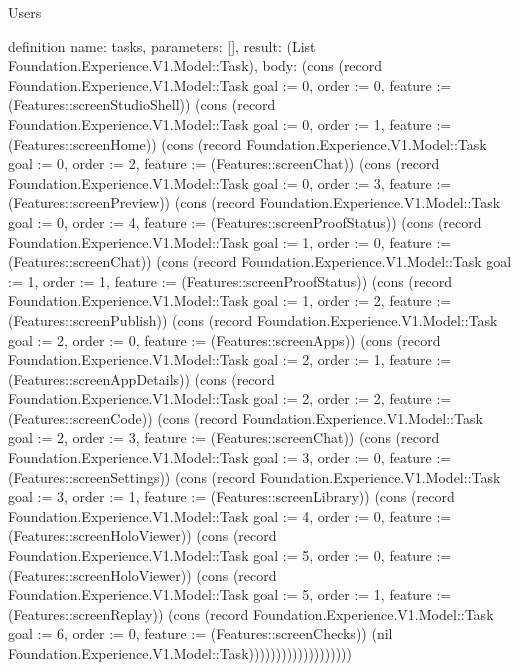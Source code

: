 \begin{lexlean}{Users}
\begin{semanticmodule}
definition{
  name: tasks,
  parameters: [],
  result: (List Foundation.Experience.V1.Model::Task),
  body: (cons (record Foundation.Experience.V1.Model::Task {goal := 0, order := 0, feature := (Features::screenStudioShell)}) (cons (record Foundation.Experience.V1.Model::Task {goal := 0, order := 1, feature := (Features::screenHome)}) (cons (record Foundation.Experience.V1.Model::Task {goal := 0, order := 2, feature := (Features::screenChat)}) (cons (record Foundation.Experience.V1.Model::Task {goal := 0, order := 3, feature := (Features::screenPreview)}) (cons (record Foundation.Experience.V1.Model::Task {goal := 0, order := 4, feature := (Features::screenProofStatus)}) (cons (record Foundation.Experience.V1.Model::Task {goal := 1, order := 0, feature := (Features::screenChat)}) (cons (record Foundation.Experience.V1.Model::Task {goal := 1, order := 1, feature := (Features::screenProofStatus)}) (cons (record Foundation.Experience.V1.Model::Task {goal := 1, order := 2, feature := (Features::screenPublish)}) (cons (record Foundation.Experience.V1.Model::Task {goal := 2, order := 0, feature := (Features::screenApps)}) (cons (record Foundation.Experience.V1.Model::Task {goal := 2, order := 1, feature := (Features::screenAppDetails)}) (cons (record Foundation.Experience.V1.Model::Task {goal := 2, order := 2, feature := (Features::screenCode)}) (cons (record Foundation.Experience.V1.Model::Task {goal := 2, order := 3, feature := (Features::screenChat)}) (cons (record Foundation.Experience.V1.Model::Task {goal := 3, order := 0, feature := (Features::screenSettings)}) (cons (record Foundation.Experience.V1.Model::Task {goal := 3, order := 1, feature := (Features::screenLibrary)}) (cons (record Foundation.Experience.V1.Model::Task {goal := 4, order := 0, feature := (Features::screenHoloViewer)}) (cons (record Foundation.Experience.V1.Model::Task {goal := 5, order := 0, feature := (Features::screenHoloViewer)}) (cons (record Foundation.Experience.V1.Model::Task {goal := 5, order := 1, feature := (Features::screenReplay)}) (cons (record Foundation.Experience.V1.Model::Task {goal := 6, order := 0, feature := (Features::screenChecks)}) (nil Foundation.Experience.V1.Model::Task)))))))))))))))))))
}


\end{semanticmodule}
\end{lexlean}
